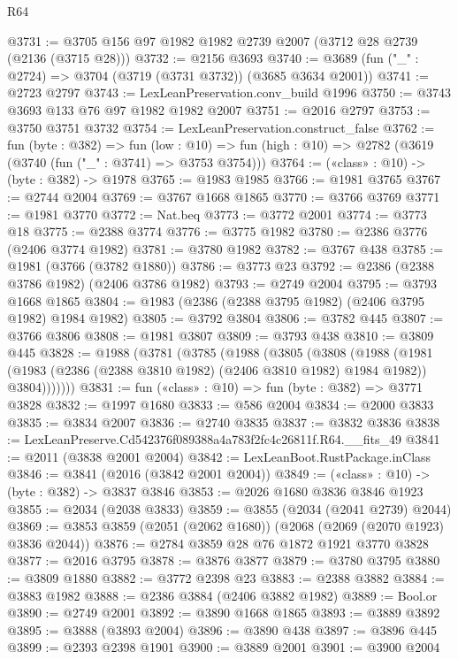 \begin{lexlean}{R64}
\begin{coremodule}
@3731 := @3705 @156 @97 @1982 @1982 @2739 @2007 (@3712 @28 @2739 (@2136 (@3715 @28)))
@3732 := @2156 @3693
@3740 := @3689 (fun ("_" : @2724) => @3704 (@3719 (@3731 @3732)) (@3685 @3634 @2001))
@3741 := @2723 @2797
@3743 := LexLeanPreservation.conv_build @1996
@3750 := @3743 @3693 @133 @76 @97 @1982 @1982 @2007
@3751 := @2016 @2797
@3753 := @3750 @3751 @3732
@3754 := LexLeanPreservation.construct_false
@3762 := fun (byte : @382) =>
  fun (low : @10) => fun (high : @10) => @2782 (@3619 (@3740 (fun ("_" : @3741) => @3753 @3754)))
@3764 := («class» : @10) -> (byte : @382) -> @1978
@3765 := @1983 @1985
@3766 := @1981 @3765
@3767 := @2744 @2004
@3769 := @3767 @1668 @1865
@3770 := @3766 @3769
@3771 := @1981 @3770
@3772 := Nat.beq
@3773 := @3772 @2001
@3774 := @3773 @18
@3775 := @2388 @3774
@3776 := @3775 @1982
@3780 := @2386 @3776 (@2406 @3774 @1982)
@3781 := @3780 @1982
@3782 := @3767 @438
@3785 := @1981 (@3766 (@3782 @1880))
@3786 := @3773 @23
@3792 := @2386 (@2388 @3786 @1982) (@2406 @3786 @1982)
@3793 := @2749 @2004
@3795 := @3793 @1668 @1865
@3804 := @1983 (@2386 (@2388 @3795 @1982) (@2406 @3795 @1982) @1984 @1982)
@3805 := @3792 @3804
@3806 := @3782 @445
@3807 := @3766 @3806
@3808 := @1981 @3807
@3809 := @3793 @438
@3810 := @3809 @445
@3828 := @1988
    (@3781
      (@3785
        (@1988
          (@3805
            (@3808
              (@1988
                (@1981
                  (@1983 (@2386 (@2388 @3810 @1982) (@2406 @3810 @1982) @1984 @1982))
                  @3804)))))))
@3831 := fun («class» : @10) => fun (byte : @382) => @3771 @3828
@3832 := @1997 @1680
@3833 := @586 @2004
@3834 := @2000 @3833
@3835 := @3834 @2007
@3836 := @2740 @3835
@3837 := @3832 @3836
@3838 := LexLeanPreserve.Cd542376f089388a4a783f2fc4c26811f.R64.__fits_49
@3841 := @2011 (@3838 @2001 @2004)
@3842 := LexLeanBoot.RustPackage.inClass
@3846 := @3841 (@2016 (@3842 @2001 @2004))
@3849 := («class» : @10) -> (byte : @382) -> @3837 @3846
@3853 := @2026 @1680 @3836 @3846 @1923
@3855 := @2034 (@2038 @3833)
@3859 := @3855 (@2034 (@2041 @2739) @2044)
@3869 := @3853 @3859 (@2051 (@2062 @1680)) (@2068 (@2069 (@2070 @1923) @3836 @2044))
@3876 := @2784 @3859 @28 @76 @1872 @1921 @3770 @3828
@3877 := @2016 @3795
@3878 := @3876 @3877
@3879 := @3780 @3795
@3880 := @3809 @1880
@3882 := @3772 @2398 @23
@3883 := @2388 @3882
@3884 := @3883 @1982
@3888 := @2386 @3884 (@2406 @3882 @1982)
@3889 := Bool.or
@3890 := @2749 @2001
@3892 := @3890 @1668 @1865
@3893 := @3889 @3892
@3895 := @3888 (@3893 @2004)
@3896 := @3890 @438
@3897 := @3896 @445
@3899 := @2393 @2398 @1901
@3900 := @3889 @2001
@3901 := @3900 @2004

\end{coremodule}
\end{lexlean}
